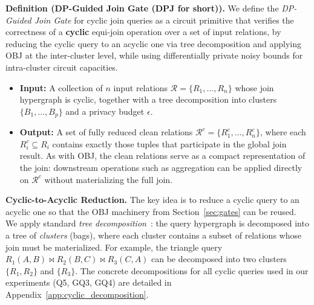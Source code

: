 \documentclass[sigconf]{acmart}
\renewcommand{\emph}[1]{\textit{#1}}
\begin{document}
\textbf{Definition (DP-Guided Join Gate (DPJ for short)).} We define the \emph{DP-Guided Join Gate} for cyclic join queries as a circuit primitive that verifies the correctness of a \textbf{cyclic} equi-join operation over a set of input relations, by reducing the cyclic query to an acyclic one via tree decomposition and applying OBJ at the inter-cluster level, while using differentially private noisy bounds for intra-cluster circuit capacities.
\begin{itemize}[leftmargin=*]
\item \textbf{Input:} A collection of $n$ input relations $\mathcal{R} = \{R_1, \dots, R_n\}$ whose join hypergraph is cyclic, together with a tree decomposition into clusters $\{B_1, \dots, B_p\}$ and a privacy budget $\epsilon$.
\item \textbf{Output:} A set of fully reduced clean relations $\mathcal{R}^c = \{R_1^c, \dots, R_n^c\}$, where each $R_i^c \subseteq R_i$ contains exactly those tuples that participate in the global join result. As with OBJ, the clean relations serve as a compact representation of the join: downstream operations such as aggregation can be applied directly on $\mathcal{R}^c$ without materializing the full join.
\end{itemize}

\noindent\textbf{Cyclic-to-Acyclic Reduction.}
%
The key idea is to reduce a cyclic query to an acyclic one so that the OBJ machinery from Section~\ref{sec:gates} can be reused. We apply standard \emph{tree decomposition}~\cite{gottlob1999hypertree, joglekar2016ajar}: the query hypergraph is decomposed into a tree of \emph{clusters} (bags), where each cluster contains a subset of relations whose join must be materialized. For example, the triangle query $R_1(A,B) \bowtie R_2(B,C) \bowtie R_3(C,A)$ can be decomposed into two clusters $\{R_1, R_2\}$ and $\{R_3\}$. The concrete decompositions for all cyclic queries used in our experiments (Q5, GQ3, GQ4) are detailed in Appendix~\ref{app:cyclic_decomposition}.
\end{document}
